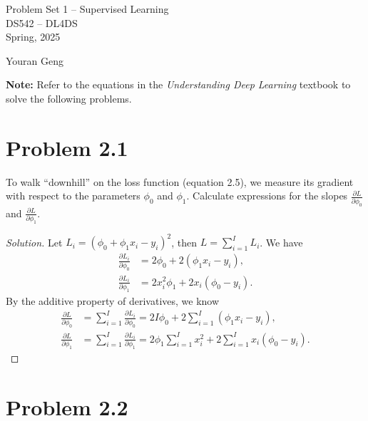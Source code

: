 \documentclass[10pt]{article}
\begin{document}
\begin{center}
    \LARGE {Problem Set 1 – Supervised Learning} \\[1em]
    \Large{DS542 – DL4DS} \\[0.5em]
    \large Spring, 2025

    \large Youran Geng
\end{center}

\vspace{2em}

\noindent\textbf{Note:} Refer to the equations in the \textit{Understanding Deep Learning} textbook to solve the following problems.

\vspace{2em}

\section*{Problem 2.1}

To walk “downhill” on the loss function (equation 2.5), we measure its gradient with respect to the parameters $\phi_0$ and $\phi_1$. Calculate expressions for the slopes $\frac{\partial L}{\partial \phi_0}$ and $\frac{\partial L}{\partial \phi_1}$.

\begin{proof}[Solution]
    Let \(L_i = (\phi_0 + \phi_1 x_i - y_i)^2\), then \(L = \sum_{i=1}^I{L_i}\). We have
    \begin{align*}
        \frac{\partial L_i}{\partial \phi_0} &= 2 \phi_0 + 2(\phi_1 x_i - y_i), \\
        \frac{\partial L_i}{\partial \phi_1} &= 2x_i^2 \phi_1 + 2 x_i(\phi_0 - y_i). 
    \end{align*}
    By the additive property of derivatives, we know
    \begin{align*}
        \frac{\partial L}{\partial \phi_0} &= \sum_{i=1}^I{\frac{\partial L_i}{\partial \phi_0}} = 2 I\phi_0 + 2 \sum_{i=1}^I{(\phi_1 x_i - y_i)}, \\
        \frac{\partial L}{\partial \phi_1} &= \sum_{i=1}^I{\frac{\partial L_i}{\partial \phi_1}} = 2\phi_1 \sum_{i=1}^I{x_i^2} + 2\sum_{i=1}^I{x_i(\phi_0 - y_i)}. 
    \end{align*}
\end{proof}

\newpage

\section*{Problem 2.2}
\end{document}
